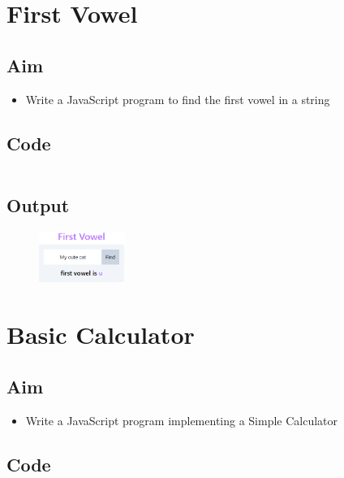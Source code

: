 \documentclass{article}
\begin{document}
\section{First Vowel}
\subsection{Aim}
\begin{itemize}
	\item Write a JavaScript program to find the first vowel in a string
\end{itemize}

\subsection{Code}
\inputminted[frame=lines, linenos, breaklines, breakanywhere, numberblanklines=false]{html}{./prog_12/index.html}

\subsection{Output}
\begin{figure}[h!]
	\centering
	\includegraphics[width=0.25\textwidth]{./Assets/p12.png}
\end{figure}
\newpage

\section{Basic Calculator}
\subsection{Aim}
\begin{itemize}
	\item Write a JavaScript program implementing a Simple Calculator
\end{itemize}

\subsection{Code}
\inputminted[frame=lines, linenos, breaklines, breakanywhere, numberblanklines=false]{html}{./prog_13/index.html}

\newpage
\end{document}

